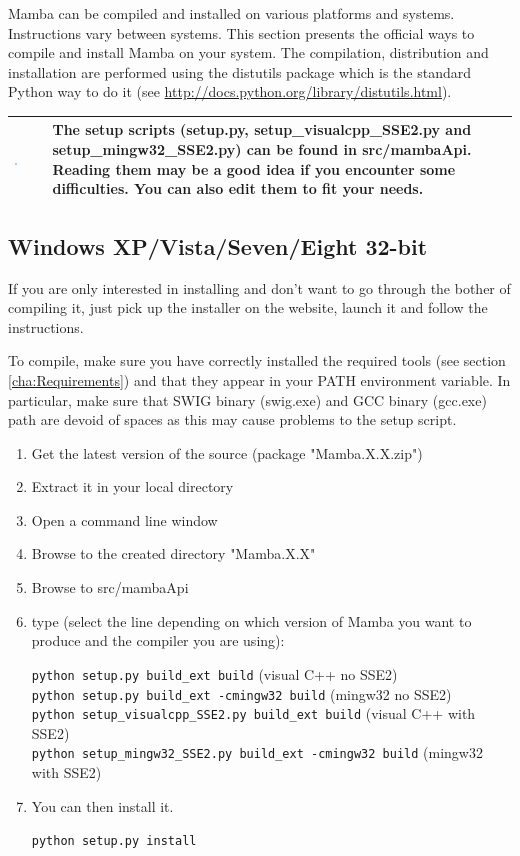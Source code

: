 \documentclass[a4paper,10pt,oneside]{article}
\newenvironment{tipBox}
{
    \begin{center}
    \begin{tabular}{ | b{0.1\textwidth} b{0.8\textwidth} | }
    \hline
    \rowcolor{lightblue}
    \includegraphics[width=0.1\textwidth]{Crystal_Clear_action_info.png} &
}
{
    \\
    \hline
    \end{tabular}
    \end{center}
}
\begin{document}
Mamba can be compiled and installed on various platforms and systems.
Instructions vary between systems. This section presents the official ways
to compile and install Mamba on your system. The compilation, distribution and
installation are performed using the distutils package which is the standard
Python way to do it (see \url{http://docs.python.org/library/distutils.html}).

\begin{tipBox}
The setup scripts (setup.py, setup\_visualcpp\_SSE2.py and setup\_mingw32\_SSE2.py)
can be found in src/mambaApi. Reading them may be a good idea if you encounter
some difficulties. You can also edit them to fit your needs.
\end{tipBox}

\subsection{Windows XP/Vista/Seven/Eight 32-bit}

If you are only interested in installing and don't want to go through the bother
of compiling it, just pick up the installer on the website, launch it and 
follow the instructions.

To compile, make sure you have correctly installed the required tools (see section
\ref{cha:Requirements}) and that they appear in your PATH environment variable.
In particular, make sure that SWIG binary (swig.exe) and GCC binary (gcc.exe)
path are devoid of spaces as this may cause problems to the setup script.

\begin{enumerate}
\item Get the latest version of the source (package "Mamba.X.X.zip")
\item Extract it in your local directory
\item Open a command line window
\item Browse to the created directory "Mamba.X.X"
\item Browse to src/mambaApi
\item type (select the line depending on which version of Mamba you want to 
produce and the compiler you are using):

\texttt{python setup.py build\_ext build} (visual C++ no SSE2)\\
\texttt{python setup.py build\_ext -cmingw32 build} (mingw32 no SSE2)\\
\texttt{python setup\_visualcpp\_SSE2.py build\_ext build} (visual C++ with SSE2)\\
\texttt{python setup\_mingw32\_SSE2.py build\_ext -cmingw32 build} (mingw32 with SSE2)

\item You can then install it.

\texttt{python setup.py install}

\end{enumerate}
\end{document}
